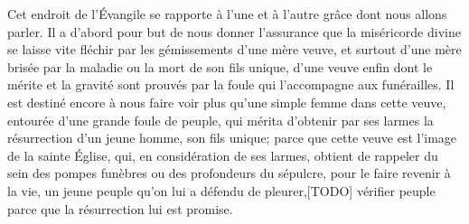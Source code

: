 Cet endroit de l’Évangile
	se rapporte à l’une et à l’autre grâce dont nous allons parler.
Il a d’abord pour but de nous donner l’assurance
	que la miséricorde divine se laisse vite fléchir
		par les gémissements d’une mère veuve,
	et surtout d’une mère brisée par la maladie ou la mort de son fils unique,
	d’une veuve enfin dont le mérite et la gravité
		sont prouvés par la foule qui l’accompagne aux funérailles.
Il est destiné encore
		à nous faire voir plus qu’une simple femme dans cette veuve,
	entourée d’une grande foule de peuple,
	qui mérita d’obtenir par ses larmes
		la résurrection d’un jeune homme, son fils unique;
	parce que cette veuve est l’image de la sainte Église,
	qui, en considération de ses larmes,
	obtient de rappeler
		du sein des pompes funèbres ou des profondeurs du sépulcre,
	pour le faire revenir à la vie,
	un jeune peuple qu’on lui a défendu de pleurer,[TODO] vérifier peuple
	parce que la résurrection lui est promise.

